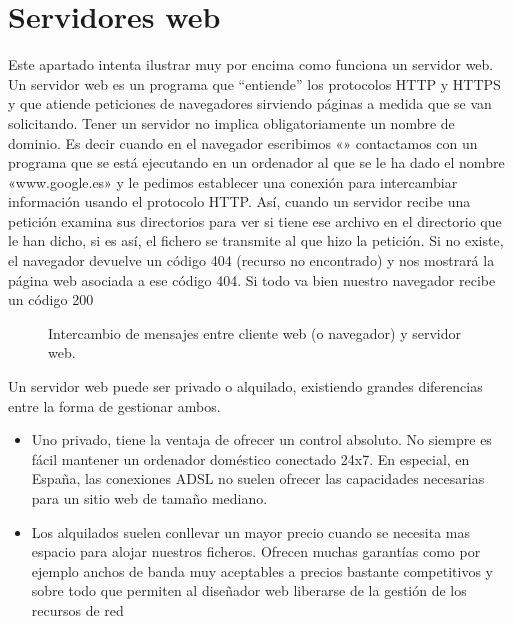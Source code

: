 \documentclass[letterpaper,10pt,spanish]{sphinxmanual}
\begin{document}
\section{Servidores web}
\label{\detokenize{tema1:servidores-web}}
Este apartado intenta ilustrar muy por encima como funciona un servidor web. Un servidor web es un programa que “entiende” los protocolos HTTP y HTTPS y que atiende peticiones de navegadores sirviendo páginas a medida que se van solicitando. Tener un servidor no implica obligatoriamente un nombre de dominio. Es decir cuando en el navegador escribimos «» contactamos con un programa que se está ejecutando en un ordenador al que se le ha dado el nombre «www.google.es» y le pedimos establecer una conexión para intercambiar información usando el protocolo HTTP. Así, cuando un servidor recibe una petición examina sus directorios para ver si tiene ese archivo en el directorio que le han dicho, si es así, el fichero se transmite al que hizo la petición. Si no existe, el navegador devuelve un código 404 (recurso no encontrado) y nos mostrará la página web asociada a ese código 404. Si todo va bien nuestro navegador recibe un código 200

\begin{figure}[htbp]
\centering
\capstart

\noindent{}
\caption{Intercambio de mensajes entre cliente web (o navegador) y servidor web.}\label{\detokenize{tema1:id1}}\end{figure}

Un servidor web puede ser privado o alquilado, existiendo grandes diferencias entre la forma de gestionar ambos.
\begin{itemize}
\item {} 
Uno privado, tiene la ventaja de ofrecer un control absoluto. No siempre es fácil mantener un ordenador doméstico conectado 24x7. En especial, en España, las  conexiones ADSL no suelen ofrecer las capacidades necesarias para un sitio web de tamaño mediano.

\item {} 
Los alquilados suelen conllevar un mayor precio cuando se necesita mas espacio para alojar nuestros ficheros. Ofrecen muchas garantías como por ejemplo anchos de banda muy aceptables a precios bastante competitivos y sobre todo que permiten al diseñador web liberarse de la gestión de los recursos de red

\end{itemize}
\end{document}
